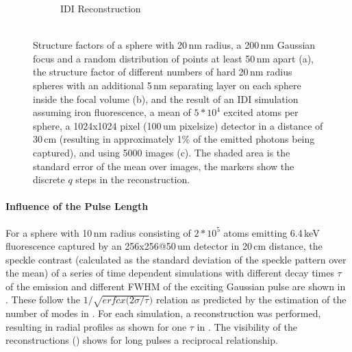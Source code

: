 \begin{figure}
\begin{subfigure}[b]{0.32\textwidth}
		\caption{IDI Reconstruction \\ $ $}
		\label{fig:multisphere2}
	\end{subfigure}
\caption[Structure factors and reconstructions for multiple spherical samples]{Structure factors of a sphere with 20\,nm radius, a 200\,nm Gaussian focus and a random distribution of points at least 50\,nm apart (a), the structure factor of different numbers of hard 20\,nm radius spheres with an additional 5\,nm separating layer on each sphere inside the focal volume (b), and the result of an IDI simulation assuming iron fluorescence, a mean of $5*10^4$ excited atoms per sphere, a 1024x1024 pixel (100\,um pixelsize) detector in a distance of 30\,cm (resulting in approximately 1\% of the emitted photons being captured), and using 5000 images (c). The shaded area is the standard error of the mean over images, the markers show the discrete $q$ steps in the reconstruction.}

\end{figure}


\paragraph{Influence of the Pulse Length}
For a sphere with 10\,nm radius consisting of $2*10^5$ atoms emitting 6.4\,keV fluorescence captured by an 256x256@50\,um detector in 20\,cm distance, the speckle contrast (calculated as the standard deviation of the speckle pattern over the mean) of a series of time dependent simulations with different decay times $\tau$ of the emission and different FWHM of the exciting Gaussian pulse are shown in .  These follow the $1/\sqrt{erfcx(2\sigma/\tau})$ relation as predicted by the estimation of the number of modes in .  For each simulation, a reconstruction was performed, resulting in radial profiles as shown for one $\tau$ in .  The visibility of the reconstructions () shows for long pulses a reciprocal relationship.

